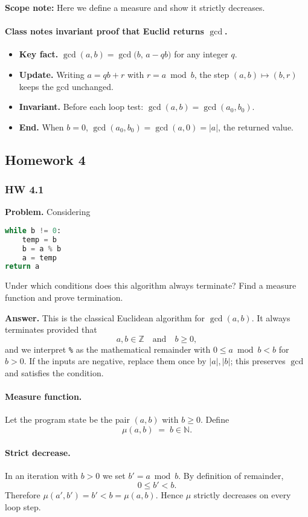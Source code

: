 \documentclass{article}
\theoremstyle{theorem}
\theoremstyle{definition}
\theoremstyle{remark}
\begin{document}
\textbf{Scope note:} Here we define a measure and show it strictly decreases.

\paragraph{Class notes invariant proof that Euclid returns $\gcd$.}
\begin{itemize}
  \item \textbf{Key fact.} $\gcd(a,b)=\gcd\!\big(b,\,a-qb\big)$ for any integer $q$.
  \item \textbf{Update.} Writing $a=qb+r$ with $r=a\bmod b$, the step $(a,b)\mapsto(b,r)$ keeps the gcd unchanged.
  \item \textbf{Invariant.} Before each loop test: $\gcd(a,b)=\gcd(a_0,b_0)$.
  \item \textbf{End.} When $b=0$, $\gcd(a_0,b_0)=\gcd(a,0)=|a|$, the returned value.
\end{itemize}

\subsection{Homework 4}

\subsubsection*{HW 4.1}
\textbf{Problem.} Considering
\begin{lstlisting}[language=Python]
while b != 0:
    temp = b
    b = a % b
    a = temp
return a
\end{lstlisting}
Under which conditions does this algorithm always terminate? Find a measure function and prove termination.

\medskip
\textbf{Answer.}  
This is the classical Euclidean algorithm for $\gcd(a,b)$. It always terminates provided that
\[
a,b \in \mathbb{Z}\quad\text{and}\quad b \ge 0,
\]
and we interpret \texttt{\%} as the mathematical remainder with $0 \le a \bmod b < b$ for $b>0$. If the inputs are negative, replace them once by $|a|,|b|$; this preserves $\gcd$ and satisfies the condition.

\paragraph{Measure function.}
Let the program state be the pair $(a,b)$ with $b \ge 0$. Define
\[
\mu(a,b) \;=\; b \in \mathbb{N}.
\]

\paragraph{Strict decrease.}
In an iteration with $b>0$ we set $b' = a \bmod b$. By definition of remainder,
\[
0 \le b' < b.
\]
Therefore $\mu(a',b') = b' < b = \mu(a,b)$. Hence $\mu$ strictly decreases on every loop step.
\end{document}
